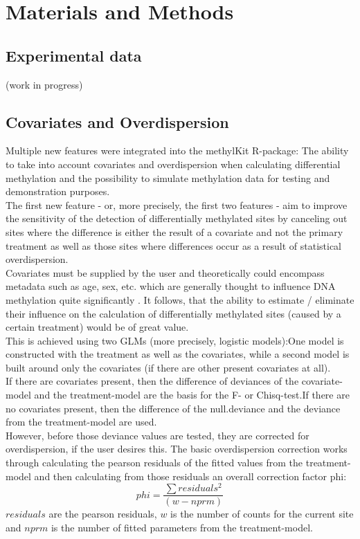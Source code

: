 \section{Materials and Methods}
\subsection{Experimental data}

(work in progress)

\subsection{Covariates and Overdispersion}

Multiple new features were integrated into the methylKit R-package: The ability to take into account covariates and overdispersion when calculating differential methylation and the possibility to simulate methylation data for testing and demonstration purposes.\\
The first new feature - or, more precisely, the first two features - aim to  improve the sensitivity of the detection of differentially methylated sites by canceling out sites where the difference is either the result of a covariate and not the primary treatment as well as those sites where differences occur as a result of statistical overdispersion.\\
Covariates must be supplied by the user and theoretically could encompass metadata such as age, sex, etc. which are generally thought to influence DNA methylation quite significantly \cite{24561809}. It follows, that the ability to estimate / eliminate their influence on the calculation of differentially methylated sites (caused by a certain treatment) would be of great value.\\
This is achieved using two GLMs (more precisely, logistic models):One model is constructed with the treatment as well as the covariates, while a second model is built around only the covariates (if there are other present covariates at all).\\
If there are covariates present, then the difference of deviances of the covariate-model and the treatment-model are the basis for the F- or Chisq-test.If there are no covariates present, then the difference of the null.deviance and the deviance from the treatment-model are used.\\
However, before those deviance values are tested, they are corrected for overdispersion, if the user desires this. The basic overdispersion correction works through calculating the pearson residuals of the fitted values from the treatment-model and then calculating from those residuals an overall correction factor phi:
\[phi = \frac{\sum{residuals^2}}{(w - nprm)}\]
$residuals$ are the pearson residuals, $w$ is the number of counts for the current site and $nprm$ is the number of fitted parameters from the treatment-model.

